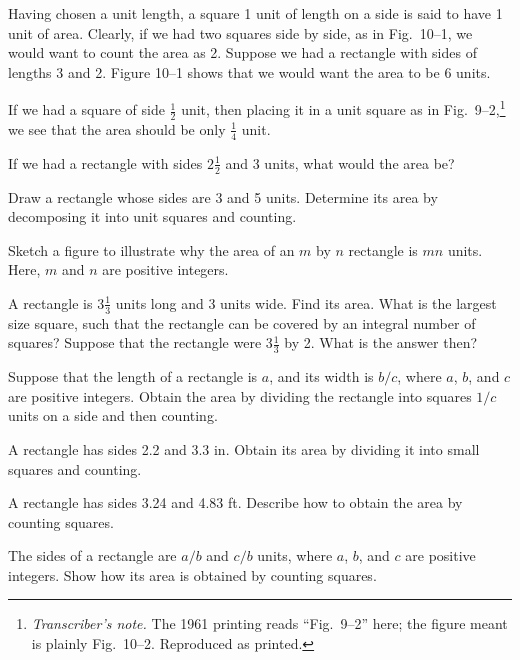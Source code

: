 \documentclass[11pt]{book}
\theoremstyle{bkplain}
\theoremstyle{XIplainnote}
\theoremstyle{bkplain}
\theoremstyle{bkplain}
\begin{document}
Having chosen a unit length, a square 1 unit of length on a side is said to
have 1 unit of area. Clearly, if we had two squares side by side, as in
Fig.~10--1, we would want to count the area as 2. Suppose we had a rectangle
with sides of lengths 3 and 2. Figure 10--1 shows that we would want the area
to be 6 units.

If we had a square of side $\tfrac{1}{2}$ unit, then placing it in a unit
square as in Fig.~9--2,\footnote{\emph{Transcriber's note.} The 1961 printing
reads ``Fig.~9--2'' here; the figure meant is plainly Fig.~10--2. Reproduced
as printed.} we see that the area should be only $\tfrac{1}{4}$ unit.

If we had a rectangle with sides $2\tfrac{1}{2}$ and 3 units, what would the
area be?

\FIGXONETWO

\begin{exercisecols}
\begin{exlist}
\item Draw a rectangle whose sides are 3 and 5 units. Determine its area by
  decomposing it into unit squares and counting.
\item Sketch a figure to illustrate why the area of an $m$ by $n$ rectangle is
  $mn$ units. Here, $m$ and $n$ are positive integers.
\item A rectangle is $3\tfrac{1}{3}$ units long and 3 units wide. Find its
  area. What is the largest size square, such that the rectangle can be
  covered by an integral number of squares? Suppose that the rectangle were
  $3\tfrac{1}{3}$ by 2. What is the answer then?
\item[\stex 4.] Suppose that the length of a rectangle is $a$, and its width
  is $b/c$, where $a$, $b$, and $c$ are positive integers. Obtain the area by
  dividing the rectangle into squares $1/c$ units on a side and then counting.
\item[5.] A rectangle has sides 2.2 and 3.3 in. Obtain its area by dividing it
  into small squares and counting.
\item[6.] A rectangle has sides 3.24 and 4.83 ft. Describe how to obtain the
  area by counting squares.
\item[\stex 7.] The sides of a rectangle are $a/b$ and $c/b$ units, where $a$,
  $b$, and $c$ are positive integers. Show how its area is obtained by counting
  squares.
\end{exlist}
\end{exercisecols}
\end{document}
